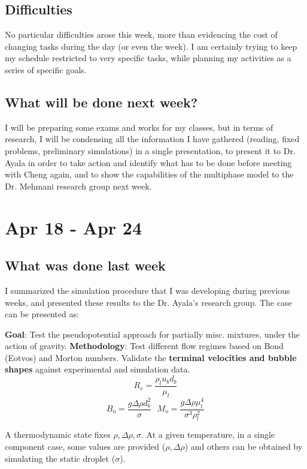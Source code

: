 \documentclass[12pt]{article}
\begin{document}
	\subsection*{Difficulties}
	No particular difficulties arose this week, more than evidencing the cost of changing tasks during the day (or even the week). I am certainly trying to keep my schedule restricted to very specific tasks, while planning my activities as a series of specific goals. 
	
	\subsection*{What will be done next week?}
	I will be preparing some exams and works for my classes, but in terms of research, I will be condensing all the information I have gathered (reading, fixed problems, preliminary simulations) in a single presentation, to present it to Dr. Ayala in order to take action and identify what has to be done before meeting with Cheng again, and to show the capabilities of the multiphase model to the Dr. Mehmani research group next week. 
	
	\pagebreak
	\section*{Apr 18 - Apr 24}
	\subsection*{What was done last week}
	I summarized the simulation procedure that I was developing during previous weeks, and presented these results to the Dr. Ayala's research group. The case can be presented as:
	
	\textbf{Goal}: Test the pseudopotential approach for partially misc. mixtures, under the action of gravity.
	\textbf{Methodology}: Test different flow regimes based on Bond (Eotvos) and Morton numbers. Validate the \textbf{terminal velocities and bubble shapes} against experimental and simulation data.
	\begin{equation*}
		R_e = \frac{\rho_l u_b d_b}{\mu_l}
	\end{equation*}
	\begin{equation*}
		B_o = \frac{g \Delta \rho d_b^2}{\sigma} \,\,\,\, 	M_o = \frac{g \Delta \rho \mu_l^4}{\sigma^3 
			\rho_l^2}
	\end{equation*}
	
	
	A thermodynamic state fixes $\rho, \Delta \rho, \sigma$. At a given temperature, in a single component case, some values are provided ($\rho, \Delta \rho$) and others can be obtained by simulating the static droplet ($\sigma$). 
	
\end{document}
